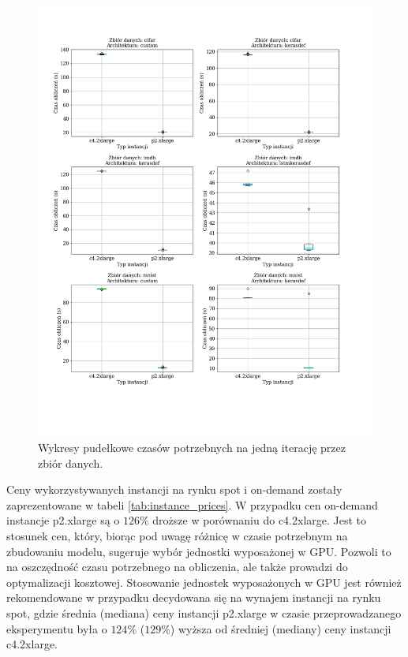 \documentclass[12pt,a4paper,twoside]{article}
\begin{document}
\begin{figure}[h]
  \centering
\includegraphics[scale=0.5]{../obrazy/fig:experiment_results.png}
\caption{Wykresy pudełkowe czasów potrzebnych na jedną iterację przez zbiór danych.\label{fig:experiment_results}}
\end{figure}

Ceny wykorzystywanych instancji na rynku spot i on-demand zostały zaprezentowane w tabeli \ref{tab:instance_prices}. W przypadku cen on-demand instancje p2.xlarge są o $126\%$ droższe w porównaniu do c4.2xlarge. Jest to stosunek cen, który, biorąc pod uwagę różnicę w czasie potrzebnym na zbudowaniu modelu, sugeruje wybór jednostki wyposażonej w GPU. Pozwoli to na oszczędność czasu potrzebnego na obliczenia, ale także prowadzi do optymalizacji kosztowej.
Stosowanie jednostek wyposażonych w GPU jest również rekomendowane w przypadku decydowana się na wynajem instancji na rynku spot, gdzie średnia (mediana) ceny instancji p2.xlarge w czasie przeprowadzanego eksperymentu była o $124\%$ ($129\%$) wyższa od średniej (mediany) ceny instancji c4.2xlarge.
\end{document}
